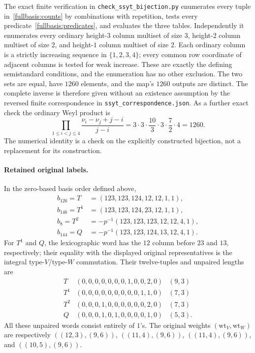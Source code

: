 The exact finite verification in \texttt{check\_ssyt\_bijection.py}
enumerates every tuple in~\eqref{fullbasis:counts} by combinations with
repetition, tests every predicate~\eqref{fullbasis:predicates}, and
evaluates the three tables.  Independently it enumerates every ordinary
height-$3$ column multiset of size $3$, height-$2$ column multiset of
size $2$, and height-$1$ column multiset of size $2$.  Each ordinary
column is a strictly increasing sequence in $\{1,2,3,4\}$; every common
row coordinate of adjacent columns is tested for weak increase.  These
are exactly the defining semistandard conditions, and the enumeration
has no other exclusion.  The two sets are equal, have $1260$ elements,
and the map's $1260$ outputs are distinct.  The complete inverse is
therefore given without an existence assumption by the reversed
finite correspondence in \texttt{ssyt\_correspondence.json}.
As a further exact check the ordinary Weyl product is
\[
 \prod_{1\leq i<j\leq4}\frac{\nu_i-\nu_j+j-i}{j-i}
 =3\cdot3\cdot\frac{10}{3}\cdot3\cdot\frac72\cdot4=1260.
\]
The numerical identity is a check on the explicitly constructed
bijection, not a replacement for its construction.

\paragraph{Retained original labels.}
In the zero-based basis order defined above,
\begin{align*}
 b_{126}=T&=(123,123,124,12,12,1,1),\\
 b_{146}=T^1&=(123,123,124,23,12,1,1),\\
 b_8=T^2&=-p^{-1}(123,123,123,12,12,4,1),\\
 b_{144}=Q&=-p^{-1}(123,123,124,13,12,4,1).
\end{align*}
For $T^1$ and $Q$, the lexicographic word has the $12$ column before
$23$ and $13$, respectively; their equality with the displayed original
representatives is the integral type-$V$/type-$W$ commutation.  Their
twelve-tuples and unpaired lengths are
\[
\begin{array}{c|c|c}
T&(0,0,0,0,0,0,0,1,0,0,2,0)&(9,3)\\
T^1&(0,0,0,0,0,0,0,0,0,1,1,0)&(7,3)\\
T^2&(0,0,0,1,0,0,0,0,0,0,2,0)&(7,3)\\
Q&(0,0,0,1,0,1,0,0,0,0,1,0)&(5,3).
\end{array}
\]
All these unpaired words consist entirely of $1$'s.  The original
weights $(\mathrm{wt}_V,\mathrm{wt}_W)$ are respectively
$((12,3),(9,6))$, $((11,4),(9,6))$, $((11,4),(9,6))$,
and $((10,5),(9,6))$.

